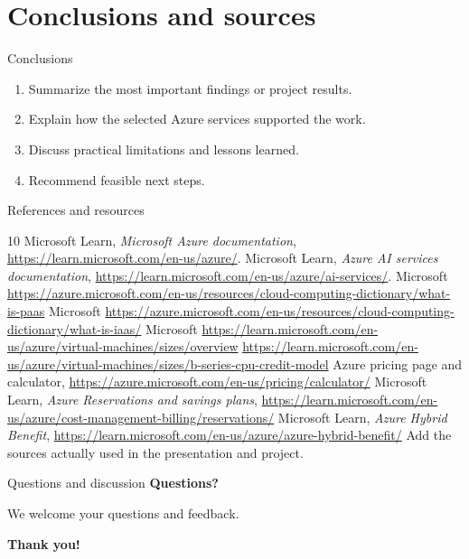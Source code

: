 \documentclass[aspectratio=169,xcolor=dvipsnames]{beamer}
\begin{document}
\section{Conclusions and sources}
\begin{frame}{Conclusions}
\begin{enumerate}
\item Summarize the most important findings or project results.
\item Explain how the selected Azure services supported the work.
\item Discuss practical limitations and lessons learned.
\item Recommend feasible next steps.
\end{enumerate}
\end{frame}
\begin{frame}[shrink=10]{References and resources}
\small
\begin{thebibliography}{10}
 Microsoft Learn, \emph{Microsoft Azure documentation}, \url{https://learn.microsoft.com/en-us/azure/}.
 Microsoft Learn, \emph{Azure AI services documentation}, \url{https://learn.microsoft.com/en-us/azure/ai-services/}.
 Microsoft \url{https://azure.microsoft.com/en-us/resources/cloud-computing-dictionary/what-is-paas}
 Microsoft \url{https://azure.microsoft.com/en-us/resources/cloud-computing-dictionary/what-is-iaas/}
 Microsoft \url{https://learn.microsoft.com/en-us/azure/virtual-machines/sizes/overview}
 \url{https://learn.microsoft.com/en-us/azure/virtual-machines/sizes/b-series-cpu-credit-model}
 Azure pricing page and calculator, \url{https://azure.microsoft.com/en-us/pricing/calculator/}
 Microsoft Learn, \emph{Azure Reservations and savings plans}, \url{https://learn.microsoft.com/en-us/azure/cost-management-billing/reservations/}
 Microsoft Learn, \emph{Azure Hybrid Benefit}, \url{https://learn.microsoft.com/en-us/azure/azure-hybrid-benefit/}
 Add the sources actually used in the presentation and project.
\end{thebibliography}
\end{frame}
\begin{frame}{Questions and discussion}
\centering
{\LARGE\bfseries Questions?}
\vspace{0.6cm}

{\large We welcome your questions and feedback.}
\end{frame}
\begin{frame}[plain]
\centering
{\Huge\bfseries Thank you!}
\end{frame}
\end{document}
